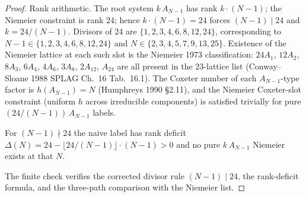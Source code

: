 \begin{proof}
Rank arithmetic. The root system $k\,A_{N-1}$ has rank
$k \cdot (N - 1)$; the Niemeier constraint is rank $24$; hence
$k \cdot (N - 1) = 24$ forces $(N - 1) \mid 24$ and
$k = 24/(N - 1)$. Divisors of $24$ are $\{1, 2, 3, 4, 6, 8, 12, 24\}$,
corresponding to $N - 1 \in \{1, 2, 3, 4, 6, 8, 12, 24\}$ and
$N \in \{2, 3, 4, 5, 7, 9, 13, 25\}$. Existence of the Niemeier
lattice at each such slot is the Niemeier 1973 classification:
$24 A_1$, $12 A_2$, $8 A_3$, $6 A_4$, $4 A_6$, $3 A_8$, $2 A_{12}$,
$A_{24}$ are all present in the $23$-lattice list (Conway--Sloane
1988 SPLAG Ch.\ 16 Tab.\ 16.1). The Coxeter number of each
$A_{N-1}$-type factor is $h(A_{N-1}) = N$ (Humphreys 1990 \S 2.11),
and the Niemeier Coxeter-slot constraint (uniform $h$ across
irreducible components) is satisfied trivially for pure
$(24/(N-1))\,A_{N-1}$ labels.

For $(N - 1) \nmid 24$ the naive label has rank deficit
$\Delta(N) = 24 - \lfloor 24/(N - 1) \rfloor \cdot (N - 1) > 0$
and no pure $k\,A_{N-1}$ Niemeier exists at that $N$.

The finite check verifies the corrected divisor rule
$(N-1)\mid 24$, the rank-deficit formula, and the three-path
comparison with the Niemeier list.
\end{proof}

